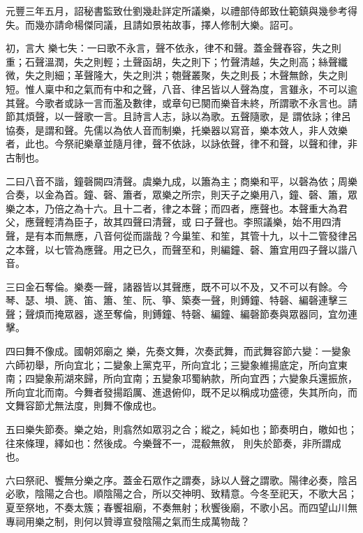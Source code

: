 
\begin{pinyinscope}

 元豐三年五月，詔秘書監致仕劉幾赴詳定所議樂，以禮部侍郎致仕範鎮與幾參考得失。而幾亦請命楊傑同議，且請如景祐故事，擇人修制大樂。詔可。



 初，言大
 樂七失：一曰歌不永言，聲不依永，律不和聲。蓋金聲舂容，失之則重；石聲溫潤，失之則輕；土聲函胡，失之則下；竹聲清越，失之則高；絲聲纖微，失之則細；革聲隆大，失之則洪；匏聲叢聚，失之則長；木聲無餘，失之則短。惟人稟中和之氣而有中和之聲，八音、律呂皆以人聲為度，言雖永，不可以逾其聲。今歌者或詠一言而濫及數律，或章句已闋而樂音未終，所謂歌不永言也。請節其煩聲，以一聲歌一言。且詩言人志，詠以為歌。五聲隨歌，是
 謂依詠；律呂協奏，是謂和聲。先儒以為依人音而制樂，托樂器以寫音，樂本效人，非人效樂者，此也。今祭祀樂章並隨月律，聲不依詠，以詠依聲，律不和聲，以聲和律，非古制也。



 二曰八音不諧，鐘磬闕四清聲。虞樂九成，以簫為主；商樂和平，以磬為依；周樂合奏，以金為首。鐘、磬、簫者，眾樂之所宗，則天子之樂用八，鐘、磬、簫，眾樂之本，乃倍之為十六。且十二者，律之本聲；而四者，應聲也。本聲重大為君父，應聲輕清為臣子，故其四聲曰清聲，或
 曰子聲也。李照議樂，始不用四清聲，是有本而無應，八音何從而諧哉？今巢笙、和笙，其管十九，以十二管發律呂之本聲，以七管為應聲。用之已久，而聲至和，則編鐘、磬、簫宜用四子聲以諧八音。



 三曰金石奪倫。樂奏一聲，諸器皆以其聲應，既不可以不及，又不可以有餘。今琴、瑟、塤、篪、笛、簫、笙、阮、箏、築奏一聲，則鎛鐘、特磬、編磬連擊三聲；聲煩而掩眾器，遂至奪倫，則鎛鐘、特磬、編鐘、編磬節奏與眾器同，宜勿連擊。



 四曰舞不像成。國朝郊廟之
 樂，先奏文舞，次奏武舞，而武舞容節六變：一變象六師初舉，所向宜北；二變象上黨克平，所向宜北；三變象維揚底定，所向宜東南；四變象荊湖來歸，所向宜南；五變象邛蜀納款，所向宜西；六變象兵還振旅，所向宜北而南。今舞者發揚蹈厲、進退俯仰，既不足以稱成功盛德，失其所向，而文舞容節尤無法度，則舞不像成也。



 五曰樂失節奏。樂之始，則翕然如眾羽之合；縱之，純如也；節奏明白，皦如也；往來條理，繹如也：然後成。今樂聲不一，混殽無敘，
 則失於節奏，非所謂成也。



 六曰祭祀、饗無分樂之序。蓋金石眾作之謂奏，詠以人聲之謂歌。陽律必奏，陰呂必歌，陰陽之合也。順陰陽之合，所以交神明、致精意。今冬至祀天，不歌大呂；夏至祭地，不奏太簇；春饗祖廟，不奏無射；秋饗後廟，不歌小呂。而四望山川無專祠用樂之制，則何以贊導宣發陰陽之氣而生成萬物哉？




\end{pinyinscope}
